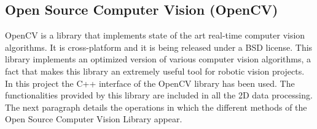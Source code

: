 
			







	\subsection{Open Source Computer Vision (OpenCV)}
	\label{opencv}

	OpenCV \cite{opencv} is a library that implements state of the art real-time computer vision 
	algorithms. 
	It is cross-platform and it is being released under a BSD \cite{BSD} license. 
	This library implements an optimized version of various computer vision algorithms, a fact that makes this library an extremely useful tool for robotic vision projects. 
	In this project the C++ interface of the OpenCV library has been used. 
	The functionalities provided by this library are included in all the 2D data processing. 
	The next paragraph details the operations in which the different methods of the Open Source Computer Vision Library appear.  

